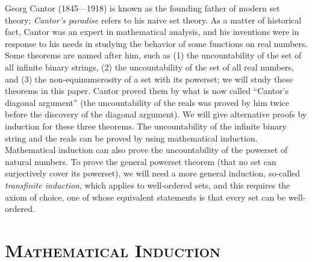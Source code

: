 \documentclass[12pt]{article}
\begin{document}
\noindent
{\sc  Georg Cantor} (1845---1918) is known as the founding father of modern set theory; {\sl Cantor’s paradise} refers to his naive set theory. As a matter of historical fact, Cantor was an expert in mathematical analysis, and his inventions were in response to his needs in studying the behavior of some functions on real numbers. Some theorems are named after him, such as (1) the uncountability of the set of all infinite binary strings, (2) the  uncountability of the set of all real numbers, and (3) the
non-equinumerosity of a set with its powerset;  we will study these theorems in this paper. Cantor proved them by what is now called “Cantor’s diagonal argument” (the uncountability of the reals was proved by him twice before the discovery of the diagonal argument). We will give alternative proofs by induction for these three theorems. The uncountability of the infinite binary string and the reals can be proved by using mathematical induction. Mathematical induction can also prove the uncountability of the powerset of natural numbers. To prove the general powerset theorem (that no set can surjectively cover its powerset), we will need a more general induction, so-called {\sl transfinite induction}, which applies to well-ordered sets, and this requires the axiom of choice, one of whose equivalent statements is that every set can be well-ordered.



\section{\textsc{Mathematical Induction}}
\end{document}
